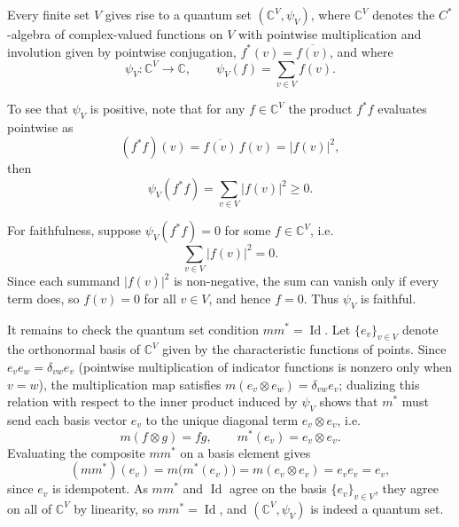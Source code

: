 \begin{example}
    \label{ex:classical_sets}
    Every finite set \( V \) gives rise to a quantum set
    \( (\mathbb{C}^{V}, \psi_V) \), where \( \mathbb{C}^{V} \)
    denotes the \( C^{*} \)-algebra of
    complex-valued functions on \( V \) with pointwise multiplication and
    involution given by pointwise conjugation,
    \( f^*(v) = \overline{f(v)} \), and where
    \[
        \psi_V \colon \mathbb{C}^{V} \rightarrow \mathbb{C}, \qquad
        \psi_V(f) = \sum_{v \in V} f(v).
    \]

    To see that \( \psi_V \) is positive, note that for any
    \( f \in \mathbb{C}^{V} \) the product \( f^*f \) evaluates pointwise as
    \[
        (f^*f)(v) = \overline{f(v)}\,f(v) = |f(v)|^2,
    \]
    then
    \[
        \psi_V(f^*f) = \sum_{v \in V} |f(v)|^2 \geq 0.
    \]

    For faithfulness, suppose \( \psi_V(f^*f) = 0 \) for some
    \( f \in \mathbb{C}^{V} \), i.e.
    \[
        \sum_{v \in V} |f(v)|^2 = 0.
    \]
    Since each summand \( |f(v)|^2 \) is non-negative, the sum can vanish
    only if every term does, so \( f(v) = 0 \) for all \( v \in V \), and
    hence \( f = 0 \). Thus \( \psi_V \) is faithful.

    It remains to check the quantum set condition \( mm^* =
    \operatorname{Id} \).
    Let \( \{e_v\}_{v \in V} \) denote the orthonormal basis of \(
    \mathbb{C}^{V} \)
    given by the characteristic functions of points. Since
    \( e_v e_w = \delta_{vw} e_v \) (pointwise multiplication of
    indicator functions is nonzero only when \( v = w \)), the
    multiplication map satisfies \( m(e_v \otimes e_w) = \delta_{vw} e_v \);
    dualizing this relation with respect to the inner product induced
    by \( \psi_V \) shows that \( m^* \) must send each basis vector
    \( e_v \) to the unique diagonal term \( e_v \otimes e_v \), i.e.
    \[
        m(f \otimes g) = fg, \qquad m^*(e_v) = e_v \otimes e_v.
    \]
    Evaluating the composite \( mm^* \) on a basis element gives
    \[
        (mm^*)(e_v) = m\big(m^*(e_v)\big) = m(e_v \otimes e_v) = e_v e_v = e_v,
    \]
    since \( e_v \) is idempotent. As \( mm^* \) and \( \operatorname{Id} \)
    agree on the basis \( \{e_v\}_{v \in V} \), they agree on all of
    \( \mathbb{C}^{V} \) by linearity, so \( mm^* = \operatorname{Id} \), and
    \( (\mathbb{C}^{V}, \psi_V) \) is indeed a quantum set.
\end{example}

